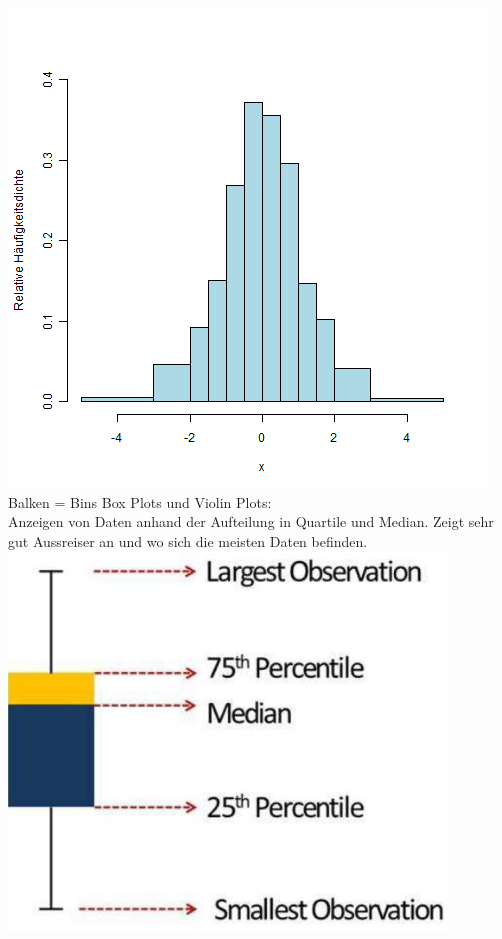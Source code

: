 \includegraphics[width=\linewidth]{img/histogram.png}
Balken = Bins
\textcolor{myblue}{Box Plots und Violin Plots:}\\
Anzeigen von Daten anhand der Aufteilung in Quartile und Median. Zeigt sehr gut Aussreiser an und wo sich die meisten Daten befinden.
\includegraphics[width=0.9\linewidth]{img/boxplot.png}
